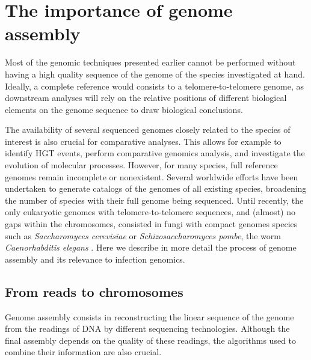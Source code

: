 

\chapter{The importance of genome assembly} %

\label{ch:01-03} %

Most of the genomic techniques presented earlier cannot be performed without having a high quality sequence of the genome of the species investigated at hand. Ideally, a complete reference would consists to a telomere-to-telomere genome, as downstream analyses will rely on the relative positions of different biological elements on the genome sequence to draw biological conclusions. 

The availability of several sequenced genomes closely related to the species of interest is also crucial for comparative analyses. This allows for example to identify \acrshort{HGT} events, perform comparative genomics analysis, and investigate the evolution of molecular processes. However, for many species, full reference genomes remain incomplete or nonexistent. Several worldwide efforts have been undertaken to generate catalogs of the genomes of all existing species, broadening the number of species with their full genome being sequenced. Until recently, the only eukaryotic genomes with telomere-to-telomere sequences, and (almost) no gaps within the chromosomes, consisted in fungi with compact genomes species such as \textit{Saccharomyces cerevisiae} or \textit{Schizosaccharomyces pombe}, the worm \textit{Caenorhabditis elegans} \cite{yoshimuraRecompletingCaenorhabditisElegans2019,mewesOverviewYeastGenome1997}. Here we describe in more detail the process of genome assembly and its relevance to infection genomics.

\section{From reads to chromosomes}

Genome assembly consists in reconstructing the linear sequence of the genome from the readings of DNA by different sequencing technologies. Although the final assembly depends on the quality of these readings, the algorithms used to combine their information are also crucial.

